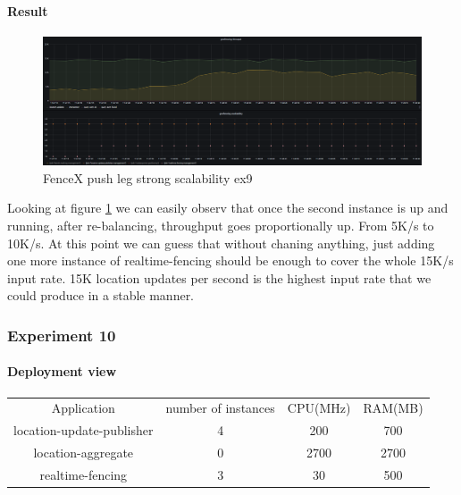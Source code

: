 \documentclass[a4]{report}
\begin{document}
    \paragraph{Result}
    \begin{figure}[ht]
        \caption{FenceX push leg strong scalability ex9}
        \label{fig:ex9}
        \includegraphics[scale=0.4]{images/evaluation/ex9-benchmarking-ongoing-2per4sec.png}
    \end{figure}

    Looking at figure \ref{fig:ex9} we can easily observ that once the second instance is up and running, after
    re-balancing, throughput goes proportionally up.
    From 5K/s to 10K/s.
    At this point we can guess that without chaning anything, just adding one more instance of realtime-fencing
    should be enough to cover the whole 15K/s input rate.
    15K location updates per second is the highest input rate that we could produce in a stable manner.

    \subsubsection{Experiment 10}
    \paragraph{Deployment view}
    \begin{center}
        \begin{tabular}{ c c c c }
            Application               &  number of instances     & CPU(MHz)  & RAM(MB)    \\
            location-update-publisher &          4               & 200       &   700      \\
            location-aggregate        &          0               & 2700      &   2700     \\
            realtime-fencing          &          3               & 30       &   500       \\
        \end{tabular}
    \end{center}
\end{document}
